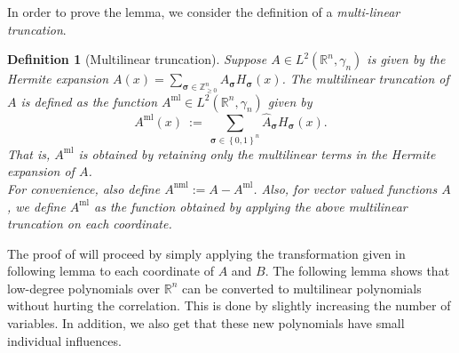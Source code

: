 \documentclass[11pt]{article}
\newcommand{\inbrace}[1]{\left \{ #1 \right \}}
\newcommand{\set}[1]{\inbrace{#1}}
\newcommand{\bit}{\set{0,1}}
\newcommand{\what}[1]{\widehat{#1}}
\newcommand{\bbR}{{\mathbb R}}
\newcommand{\bbZ}{{\mathbb Z}}
\newcommand{\bsigma}{{\boldsymbol \sigma}}
\newtheorem{defn}[theorem]{Definition}
\newcommand{\ml}{\mathrm{ml}}
\newcommand{\nml}{\mathrm{nml}}
\begin{document}
\noindent In order to prove the lemma, we consider the definition of a {\em multi-linear truncation}.

\begin{defn}[Multilinear truncation]\label{def:ml_truncation}
	Suppose $A \in L^2(\bbR^n, \gamma_n)$ is given by the Hermite expansion $A(x) = \sum\limits_{\bsigma \in \bbZ_{\ge 0}^n} \what{A}_{\bsigma} H_{\bsigma}(x)$. The {\em multilinear truncation} of $A$ is defined as the function $A^{\ml} \in L^2(\bbR^n, \gamma_n)$ given by
	\[A^{\ml}(x) ~:=~ \sum_{\bsigma \in \bit^n} \what{A}_{\bsigma} H_{\bsigma}(x).\]
	That is, $A^{\ml}$ is obtained by retaining only the multilinear terms in the Hermite expansion of $A$.\\
	For convenience, also define $A^{\nml} := A - A^{\ml}$. Also, for vector valued functions $A$, we define $A^{\ml}$ as the function obtained by applying the above multilinear truncation on each coordinate.
\end{defn}

The proof of  will proceed by simply applying the transformation given in following lemma to each coordinate of $A$ and $B$. The following lemma shows that low-degree polynomials over $\bbR^n$ can be converted to multilinear polynomials without hurting the correlation. This is done by slightly increasing the number of variables. In addition, we also get that these new polynomials have small individual influences.
\end{document}
